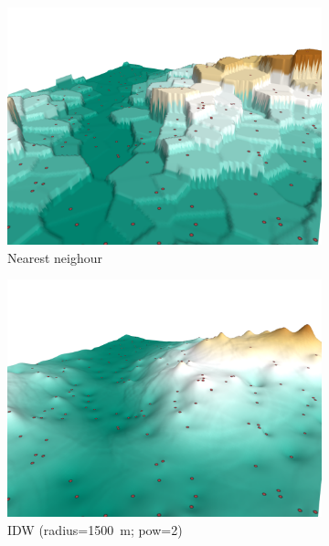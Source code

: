 \begin{figure}
  \centering
  \begin{subfigure}[b]{0.41\linewidth}
    \centering
    \includegraphics{figs/results/nn.png}
    \caption{Nearest neighour}
  \end{subfigure}%
  \quad
  \begin{subfigure}[b]{0.41\linewidth}
    \centering
    \includegraphics{figs/results/idw_r1500_p2.png}
    \caption{IDW (radius=\SI{1500}{\m}; pow=2)}
  \end{subfigure}
  \quad
  \begin{subfigure}[b]{0.41\linewidth}
    \centering

\end{subfigure}
\end{figure}

